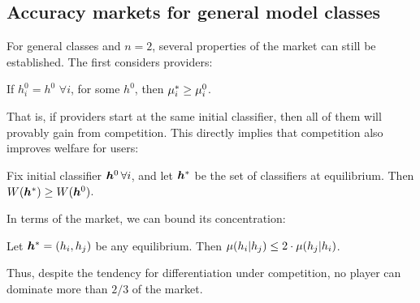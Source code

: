 


\subsection{Accuracy markets for general model classes}

For general classes and $n=2$,
several properties of the market can still be established.
The first considers providers:
\begin{proposition}
\label{prop:ms_increases}
If $h_i^0=h^0 \,\, \forall i$,  for some $h^0$,
then $\mu_i^* \ge \mu_i^0$.
\end{proposition}
That is, if providers start at the same initial classifier,
then all of them will provably gain from competition.
This directly implies that competition also improves welfare for users:
\begin{corollary}
\label{corr:welfare}
Fix initial classifier ${\bm{h}}^0 \,  \forall i$, and let ${\bm{h}}^*$
be the set of classifiers at equilibrium. Then
$W({\bm{h}}^*) \ge W({\bm{h}}^0)$.
\end{corollary}

In terms of the market, we can bound its concentration:
\begin{proposition}
\label{prop:bounded_market_concentration}
Let ${\bm{h}}^*=(h_i,h_j)$ be any equilibrium.
Then $ \mu(h_i|h_j)\le 2\cdot\mu(h_j|h_i)$.
\end{proposition}
Thus,
despite the tendency for differentiation under competition,
no player can dominate more than $2/3$ of the market.



